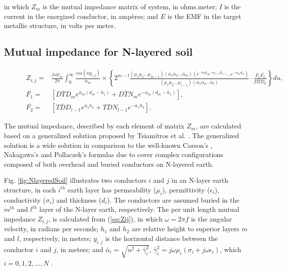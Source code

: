 \documentclass{IEEEtran4PSCC}
\begin{document}
\noindent in which $Z_{m}$ is the mutual impedance matrix of system, in ohms.meter; $I$ is the current in the energized conductor, in ampères; and $E$ is the EMF in the target metallic structure, in volts per meter.

\subsection{Mutual impedance for N-layered soil}

\begin{figure}[b]
	\hrulefill
	\begin{equation}\label{eq:Zij}
		\begin{aligned}
			Z_{i,j} = {} & \frac{j\omega\mu_{m}}{2\pi}\int_{0}^{\infty} \frac{cos(uy_{i,j})}{\bar\alpha_{m}} \times \left\{2^{m-l}\frac{(\mu_{1}\mu_{2}\dots\mu_{m-1})(\bar\alpha_{1}\bar\alpha_{2}\dots\bar\alpha_{m})(e^{-\bar\alpha_{l}d_{l}}e^{-\bar\alpha_{l+1}d_{l+1}}\dots e^{-\bar\alpha_{m}d_{m}})}{(\mu_{1}\mu_{2}\dots\mu_{l-1})(\bar\alpha_{1}\bar\alpha_{2}\dots\bar\alpha_{l})}\cdot\frac{\bar{F_{1}}\bar{F_{2}}}{D\bar{T}D_{0}}\right\}du,	\\
			\bar{F_{1}} = {} & [D\bar{T}D_{m} e^{\bar{\alpha}_{m}(d_{m}-h_{1})} + D\bar{T}N_{m}e^{-\bar{\alpha}_{m}(d_{m}-h_{1})}], \\			
			\bar{F_{2}} = {} & [T\bar{D}D_{l-1}e^{\bar{\alpha}_{1}h_{2}} + T\bar{D}N_{l-1}e^{-\bar{\alpha}_{1}h_{2}}].
		\end{aligned}
	\end{equation}
\end{figure}


The mutual impedance, described by each element of matrix $Z_{m}$, are calculated based on a generalized solution proposed by Tsiamitros et al. \cite{Tsiamitros2008a}. The generalized solution is a wide solution in comparison to the well-known Carson's \cite{Carson1926}, Nakagawa's \cite{Nakagawa} and Pollaczek's \cite{Pollaczek1926} formulas due to cover complex configurations composed of both overhead and buried conductors on N-layered earth. 

Fig. \ref{fig:NlayeredSoil} illustrates two conductors $i$ and $j$ in an N-layer earth structure, in each $i^{th}$ earth layer has permeability ($\mu_{i}$), permittivity ($\epsilon_{i}$), conductivity ($\sigma_{i}$) and thickness ($d_{i}$). The conductors are assumed buried in the $m^{th}$ and $l^{th}$ layer of the N-layer earth, respectively. The per unit length mutual impedance $Z_{i,j}$, is calculated from (\ref{eq:Zij}), in which $\omega = 2\pi f$ is the angular velocity, in radians per seconds; $h_{1}$ and $h_{2}$ are relative height to superior layers $m$ and $l$, respectively, in meters; $y_{i,j}$ is the horizontal distance between the conductor $i$ and $j$, in meters; and $\bar{\alpha}_{i} = \sqrt{u^2 + \bar{\gamma}_{i}^{2}}$, $\bar{\gamma}_{i}^{2} = j\omega\mu_{i}(\sigma_{i} + j\omega\epsilon_{i})$, which $i = 0,1,2,\dots,N$ \cite{Tsiamitros2008a}.
\end{document}
